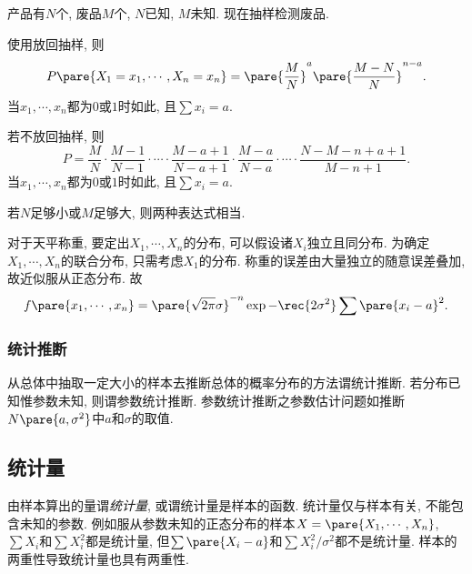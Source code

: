 \documentclass[../Statistics.tex]{subfiles}
\begin{document}

\begin{sample}
    \begin{ex}
        产品有$N$个, 废品$M$个, $N$已知, $M$未知. 现在抽样检测废品.
        \begin{cenum}
            \item 使用放回抽样, 则
            \[ P\pare{X_1= x_1,\cdots,X_n = x_n} = \pare{\frac{M}{N}}^a\pare{\frac{M-N}{N}}^{n-a}. \]
            当$x_1,\cdots,x_n$都为$0$或$1$时如此, 且$\sum x_i = a$.
            \item 若不放回抽样, 则
            \[ P = \frac{M}{N}\cdot \frac{M-1}{N-1} \cdot\cdots\cdot \frac{M-a+1}{N-a+1}\cdot \frac{M-a}{N-a}\cdot \cdots  \cdot \frac{N-M-n+a+1}{M-n+1}. \]
            当$x_1,\cdots,x_n$都为$0$或$1$时如此, 且$\sum x_i = a$.
        \end{cenum}
        若$N$足够小或$M$足够大, 则两种表达式相当.
    \end{ex}
\end{sample}
\begin{sample}
    \begin{ex}
        对于天平称重, 要定出$X_1,\cdots,X_n$的分布, 可以假设诸$X_i$独立且同分布. 为确定$X_1,\cdots,X_n$的联合分布, 只需考虑$X_1$的分布. 称重的误差由大量独立的随意误差叠加, 故近似服从正态分布. 故
        \[ f\pare{x_1,\cdots,x_n} = \pare{\sqrt{2\pi}\sigma}^{-n}\exp{-\rec{2\sigma^2}\sum{\pare{x_i-a}^2}}. \]
    \end{ex}
\end{sample}


\subsubsection{统计推断} %
\label{ssub:统计推断}

从总体中抽取一定大小的样本去推断总体的概率分布的方法谓统计推断. 若分布已知惟参数未知, 则谓参数统计推断. 参数统计推断之参数估计问题如推断$N\pare{a,\sigma^2}$中$a$和$\sigma$的取值.



\subsection{统计量} %
\label{sub:统计量}

由样本算出的量谓\emph{统计量}, 或谓统计量是样本的函数. 统计量仅与样本有关, 不能包含未知的参数. 例如服从参数未知的正态分布的样本$X = \pare{X_1,\cdots,X_n}$, $\sum X_i$和$\sum X_i^2$都是统计量, 但$\sum\pare{X_i - a}$和$\sum X_i^2/\sigma^2$都不是统计量. 样本的两重性导致统计量也具有两重性.
\end{document}
